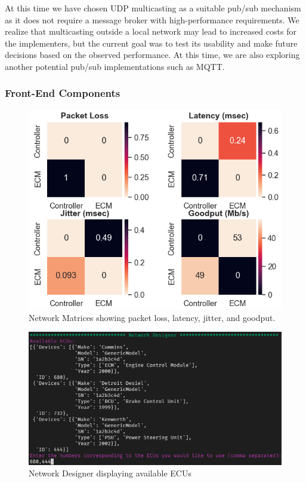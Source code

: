 \documentclass[letterpaper,twocolumn,12pt]{article}
\begin{document}
At this time we have chosen UDP multicasting as a suitable pub/sub mechanism as it does not require a message broker with high-performance requirements. We realize that multicasting outside a local network may lead to increased costs for the implementers, but the current goal was to test its usability and make future decisions based on the observed performance. At this time, we are also exploring another potential pub/sub implementations such as MQTT.

\subsubsection{Front-End Components}
\begin{figure}[]
    \centering
    \includegraphics[width=\linewidth]{images/network_matrix.png}
    \caption[]{Network Matrices showing packet loss, latency, jitter, and goodput.}
    \label{fig:network_matrix}
\end{figure}
\begin{figure}[]
    \centering
    \includegraphics[width=\linewidth]{images/network_designer.png}
    \caption[]{Network Designer displaying available ECUs\protect\footnotemark}
    \label{fig:network_designer}
\end{figure}
\end{document}
